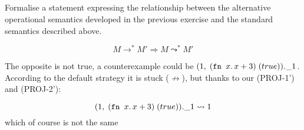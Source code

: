 \subsection{}

Formalise a statement expressing the relationship between the
alternative operational semantics developed in the previous exercise
and the standard semantics described above.

\[M \to^* M' \Rightarrow M \leadsto^* M' \]

The opposite is not true, a counterexample could be
\((1,\;(\texttt{fn }x.\,x+3)\;(true)).\_1\). According to the
default strategy it is stuck (\(\not\to\)), but thanks to our
(PROJ-1') and (PROJ-2'):

\[(1,\;(\texttt{fn }x.\,x+3)\;(true)).\_1 \leadsto 1\] which of
course is not the same
